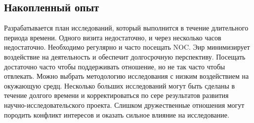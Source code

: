 \documentclass[12pt,]{article}
\begin{document}
\subsection{Накопленный опыт}
Разрабатывается план исследований, который выполнится в течение длительного периода времени. Одного визита недостаточно, и через несколько часов недостаточно. Необходимо регулярно и часто посещать NOC. Эир минимизирует воздействие на деятельность и обеспечит долгосрочную перспективу. Посещать достаточно часто чтобы поддерживать отношение, но не так часто чтобы отвлекать. Можно выбрать методологию исследования с низким воздействием на окужающую средц. Несколько больших исследований могут быть сделаны в течение долгого времени и корректироваться по сере результатов развития научно-исследовательского проекта. Слишком дружественные отношения могут породить конфликт интересов и оказать сильное влияние на исследование.
\end{document}
